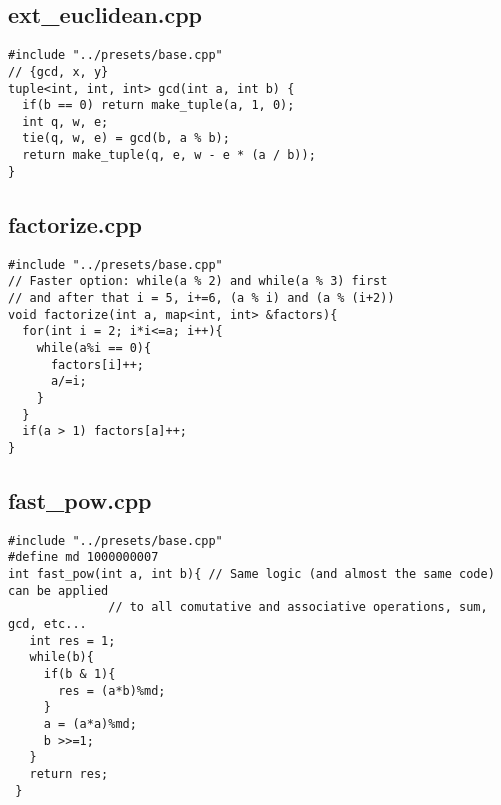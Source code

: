 \documentclass[11pt,landscape,twocolumn]{article}
\begin{document}
\subsection*{ext\_euclidean.cpp}
\begin{lstlisting}
#include "../presets/base.cpp"
// {gcd, x, y}
tuple<int, int, int> gcd(int a, int b) {
  if(b == 0) return make_tuple(a, 1, 0);
  int q, w, e;
  tie(q, w, e) = gcd(b, a % b);
  return make_tuple(q, e, w - e * (a / b));
}

\end{lstlisting}

\subsection*{factorize.cpp}
\begin{lstlisting}
#include "../presets/base.cpp"
// Faster option: while(a % 2) and while(a % 3) first
// and after that i = 5, i+=6, (a % i) and (a % (i+2))
void factorize(int a, map<int, int> &factors){
  for(int i = 2; i*i<=a; i++){
    while(a%i == 0){
      factors[i]++;
      a/=i;
    }
  }
  if(a > 1) factors[a]++;
}
\end{lstlisting}

\subsection*{fast\_pow.cpp}
\begin{lstlisting}
#include "../presets/base.cpp"
#define md 1000000007
int fast_pow(int a, int b){ // Same logic (and almost the same code) can be applied 
              // to all comutative and associative operations, sum, gcd, etc...
   int res = 1;
   while(b){
     if(b & 1){
       res = (a*b)%md;
     }
     a = (a*a)%md;
     b >>=1;
   }
   return res;
 }

\end{lstlisting}
\end{document}
